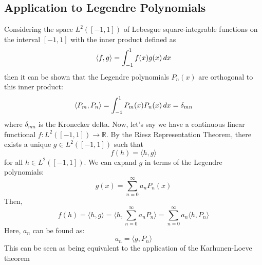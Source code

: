 \documentclass{article}
\begin{document}
\subsection{Application to Legendre Polynomials}

Considering the space $L^2 ([- 1, 1])$ of Lebesgue square-integrable functions
on the interval $[- 1, 1]$ with the inner product defined as
\begin{equation}
  \langle f, g \rangle = \int_{- 1}^1 f (x) g (x)  \hspace{0.17em} dx
\end{equation}
then it can be shown that the Legendre polynomials $P_n (x)$ are orthogonal to
this inner product:
\begin{equation}
  \langle P_m, P_n \rangle = \int_{- 1}^1 P_m (x) P_n (x)  \hspace{0.17em} dx
  = \delta_{mn}
\end{equation}
where $\delta_{mn}$ is the Kronecker delta. Now, let's say we have a
continuous linear functional $f : L^2 ([- 1, 1]) \to \mathbb{R}$. By the Riesz
Representation Theorem, there exists a unique $g \in L^2 ([- 1, 1])$ such that
\begin{equation}
  f (h) = \langle h, g \rangle
\end{equation}
for all $h \in L^2 ([- 1, 1])$. We can expand $g$ in terms of the Legendre
polynomials:
\begin{equation}
  g (x) = \sum_{n = 0}^{\infty} a_n P_n (x)
\end{equation}
Then,
\begin{equation}
  f (h) = \langle h, g \rangle = \langle h, \sum_{n = 0}^{\infty} a_n P_n
  \rangle = \sum_{n = 0}^{\infty} a_n  \langle h, P_n \rangle
\end{equation}
Here, $a_n$ can be found as:
\begin{equation}
  a_n = \langle g, P_n \rangle
\end{equation}
This can be seen as being equivalent to the application of the Karhunen-Loeve
theorem
\end{document}
